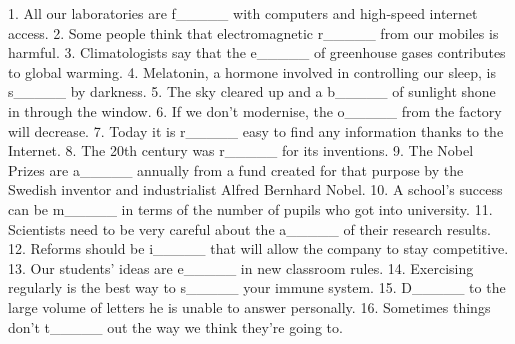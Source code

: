 1. All our laboratories are f\_\_\_\_\_ with computers and high-speed internet access.
2. Some people think that electromagnetic r\_\_\_\_\_ from our mobiles is harmful. 3.
Climatologists say that the e\_\_\_\_\_ of greenhouse gases contributes to global
warming. 4. Melatonin, a hormone involved in controlling our sleep, is s\_\_\_\_\_ by
darkness. 5. The sky cleared up and a b\_\_\_\_\_ of sunlight shone in through the
window. 6. If we don’t modernise, the o\_\_\_\_\_ from the factory will decrease. 7.
Today it is r\_\_\_\_\_ easy to find any information thanks to the Internet. 8. The
20th century was r\_\_\_\_\_ for its inventions. 9. The Nobel Prizes are a\_\_\_\_\_
annually from a fund created for that purpose by the Swedish inventor and industrialist
Alfred Bernhard Nobel. 10. A school’s success can be m\_\_\_\_\_ in terms of the number
of pupils who got into university. 11. Scientists need to be very careful about the
a\_\_\_\_\_ of their research results. 12. Reforms should be i\_\_\_\_\_ that will
allow the company to stay competitive. 13. Our students’ ideas are e\_\_\_\_\_ in
new classroom rules. 14. Exercising regularly is the best way to s\_\_\_\_\_ your
immune system. 15. D\_\_\_\_\_ to the large volume of letters he is unable to answer
personally. 16. Sometimes things don't t\_\_\_\_\_ out the way we think they're going
to.


